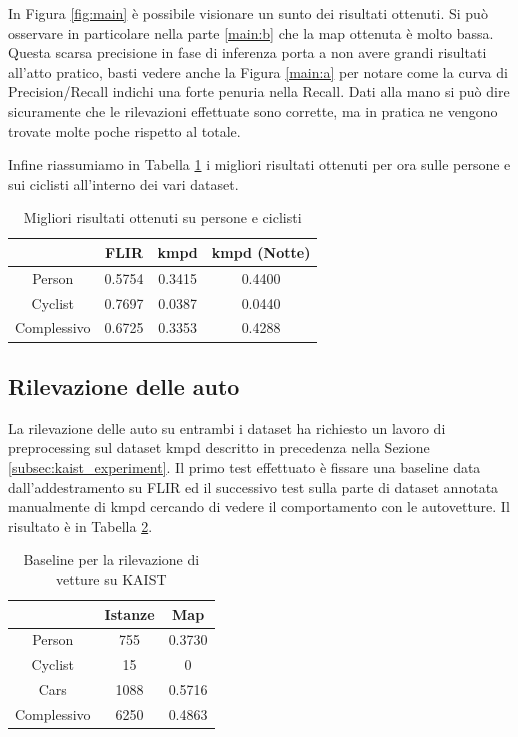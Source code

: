In Figura \ref{fig:main} è possibile visionare un sunto dei risultati ottenuti. Si può osservare in particolare nella parte \ref{main:b} che la \ac{map} ottenuta è molto bassa. Questa scarsa precisione in fase di inferenza porta a non avere grandi risultati all'atto pratico, basti vedere anche la Figura \ref{main:a} per notare come la curva di Precision/Recall indichi una forte penuria nella Recall. 
Dati alla mano si può dire sicuramente che le rilevazioni effettuate sono corrette, ma in pratica ne vengono trovate molte poche rispetto al totale. 

Infine riassumiamo in Tabella \ref{tab:best_kmpd_flir} i migliori risultati ottenuti per ora sulle persone e sui ciclisti all'interno dei vari dataset. 

\begin{table}[]
    \begin{tabular}{c|c|c|c|}
    \cline{2-4}
     & FLIR & \ac{kmpd} & \ac{kmpd} (Notte) \\ \hline
    \multicolumn{1}{|c|}{Person} & 0.5754 & 0.3415 & 0.4400 \\ \hline
    \multicolumn{1}{|c|}{Cyclist} & 0.7697 & 0.0387 & 0.0440 \\ \hline
    \multicolumn{1}{|c|}{Complessivo} & 0.6725 & 0.3353 & 0.4288 \\ \hline
    \end{tabular}
    \caption{Migliori risultati ottenuti su persone e ciclisti}
    \label{tab:best_kmpd_flir}
\end{table}

\subsection{Rilevazione delle auto} %
La rilevazione delle auto su entrambi i dataset ha richiesto un lavoro di preprocessing sul dataset \ac{kmpd} descritto in precedenza nella Sezione \ref{subsec:kaist_experiment}.
Il primo test effettuato è fissare una baseline data dall'addestramento su FLIR ed il successivo test sulla parte di dataset annotata manualmente di \ac{kmpd} cercando di vedere il comportamento con le autovetture. Il risultato è in Tabella \ref{table:baseline_car_kaist}. 
\begin{table}[]
    \centering
    \begin{tabular}{c|c|c|}
    \cline{2-3}
     & Istanze & Map \\ \hline
    \multicolumn{1}{|c|}{Person} & 755 & 0.3730 \\ \hline
    \multicolumn{1}{|c|}{Cyclist} & 15 & 0 \\ \hline
    \multicolumn{1}{|c|}{Cars} & 1088 & 0.5716 \\ \hline
    \multicolumn{1}{|c|}{Complessivo} & 6250 & 0.4863 \\ \hline
    \end{tabular}
    \caption{Baseline per la rilevazione di vetture su KAIST}
    \label{table:baseline_car_kaist}
\end{table} 

